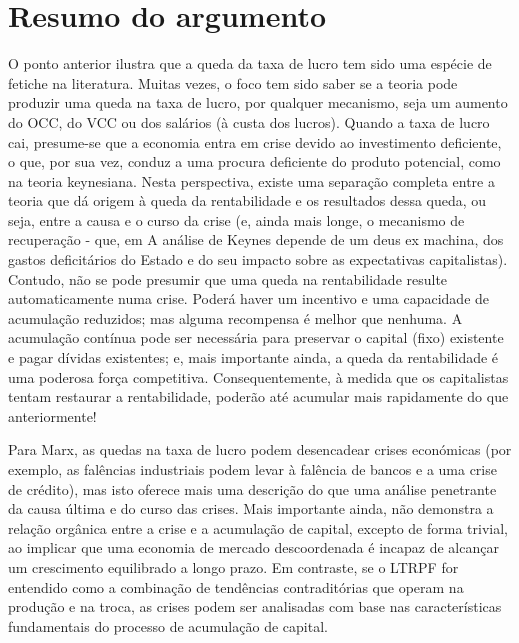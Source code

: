 \section{Resumo do argumento}
 \par 
O ponto anterior ilustra que a queda da taxa de lucro tem sido uma espécie de fetiche na literatura. Muitas vezes, o foco tem sido saber se a teoria pode produzir uma queda na taxa de lucro, por qualquer mecanismo, seja um aumento do OCC, do VCC ou dos salários (à custa dos lucros). Quando a taxa de lucro cai, presume-se que a economia entra em crise devido ao investimento deficiente, o que, por sua vez, conduz a uma procura deficiente do produto potencial, como na teoria keynesiana. Nesta perspectiva, existe uma separação completa entre a teoria que dá origem à queda da rentabilidade e os resultados dessa queda, ou seja, entre a causa e o curso da crise (e, ainda mais longe, o mecanismo de recuperação - que, em A análise de Keynes depende de um deus ex machina, dos gastos deficitários do Estado e do seu impacto sobre as expectativas capitalistas). Contudo, não se pode presumir que uma queda na rentabilidade resulte automaticamente numa crise. Poderá haver um incentivo e uma capacidade de acumulação reduzidos; mas alguma recompensa é melhor que nenhuma. A acumulação contínua pode ser necessária para preservar o capital (fixo) existente e pagar dívidas existentes; e, mais importante ainda, a queda da rentabilidade é uma poderosa força competitiva. Consequentemente, à medida que os capitalistas tentam restaurar a rentabilidade, poderão até acumular mais rapidamente do que anteriormente!
 \par 
Para Marx, as quedas na taxa de lucro podem desencadear crises económicas (por exemplo, as falências industriais podem levar à falência de bancos e a uma crise de crédito), mas isto oferece mais uma descrição do que uma análise penetrante da causa última e do curso das crises. Mais importante ainda, não demonstra a relação orgânica entre a crise e a acumulação de capital, excepto de forma trivial, ao implicar que uma economia de mercado descoordenada é incapaz de alcançar um crescimento equilibrado a longo prazo. Em contraste, se o LTRPF for entendido como a combinação de tendências contraditórias que operam na produção e na troca, as crises podem ser analisadas com base nas características fundamentais do processo de acumulação de capital.
 \par 
